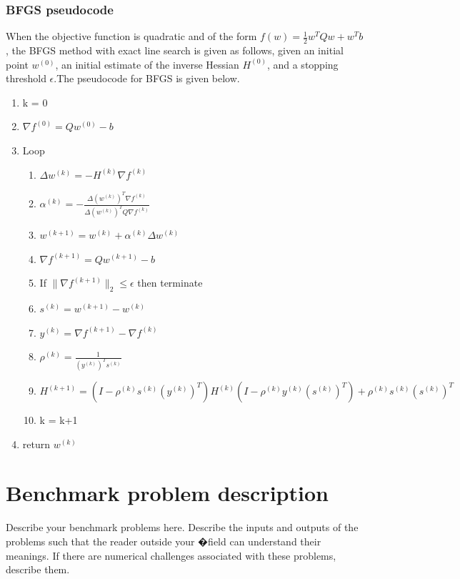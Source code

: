 \documentclass[10pt,twocolumn]{article}
\begin{document}
\subsubsection{BFGS pseudocode}
When the objective function is quadratic and of the form $f(w) = \frac{1}{2}w^T Q w + w^T b$, the BFGS method with exact line search is given as follows, given an initial point $w^{(0)}$, an initial estimate of the inverse Hessian $H^{(0)}$, and a stopping threshold $\epsilon$.The pseudocode for BFGS is given below. \\
\begin{enumerate}
\item k = 0
\item $\nabla f^{(0)} = Qw^{(0)} - b$
\item Loop
\begin{enumerate}[label={(\roman*)},leftmargin=2\parindent]
\item $\Delta w^{(k)} = - H^{(k)}\nabla f^{(k)}$
\item $\alpha^{(k)}= -\frac{\Delta (w^{(k)})^T \nabla f^{(k)} }{\Delta (w^{(k)})^T Q \nabla f^{(k)}}$
\item $w^{(k+1)} = w^{(k)} + \alpha^{(k)}\Delta w^{(k)}$
\item $\nabla f^{(k+1)} = Qw^{(k+1)} - b$
\item If $\lVert  \nabla f^{(k+1)} \rVert_{2} \leq \epsilon$ then terminate
\item $s^{(k)} = w^{(k+1)} - w^{(k)}$
\item $y ^{(k)} =  \nabla f^{(k+1)}  -  \nabla f^{(k)} $
\item $\rho^{(k)} = \frac{1}{(y^{(k)})^Ts^{(k)}}$
\item $H^{(k+1)} = (I - \rho^{(k)} s^{(k)}(y^{(k)})^T)H^({k}) (I - \rho^{(k)} y^{(k)}(s^{(k)})^T) +\rho^{(k)} s^{(k)}(s^{(k)})^T $
\item k = k+1
\end{enumerate}
\item return $w^{(k)}$
\end{enumerate}

\section{Benchmark problem description}
Describe your benchmark problems here. Describe the inputs and outputs of the problems such that the reader outside your �field can understand their meanings. If there are numerical challenges associated with these problems, describe them.
\end{document}
